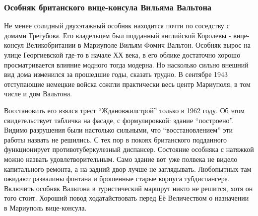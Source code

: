  
 
 
 
 

\subsubsection{Особняк британского вице-консула Вильяма Вальтона}

Не менее солидный двухэтажный особняк находится почти по соседству с домами
Трегубова. Его владельцем был подданный английской Королевы - вице-консул
Великобритании в Мариуполе Вильям Фомич Вальтон. Особняк вырос на улице
Георгиевской где-то в начале ХХ века, в его облике достаточно хорошо
просматривается влияние модного тогда модерна. Но насколько сильно внешний вид
дома изменился за прошедшие годы, сказать трудно. В сентябре 1943 отступающие
немецкие войска сожгли практически весь центр Мариуполя, в том числе и дом
Вальтона.


Восстановить его взялся трест \enquote{Ждановжилстрой} только в 1962 году. Об этом
свидетельствует табличка на фасаде, с формулировкой: здание \enquote{построено}. Видимо
разрушения были настолько сильными, что \enquote{восстановлением} эти работы назвать не
решились. С тех пор в покоях британского подданного функционирует
противотуберкулезный диспансер. Состояние особняка с натяжкой можно назвать
удовлетворительным. Само здание вот уже полвека не видело капитального ремонта,
а на задний двор лучше не заглядывать. Любопытных там ожидают развалины фонтана
и брошенные старые корпуса тубдиспансера. Включить особняк Вальтона в
туристический маршрут никто не решится, хотя он того стоит. Хороший повод
ходатайствовать перед Её Величеством о назначении в Мариуполь вице-консула.

